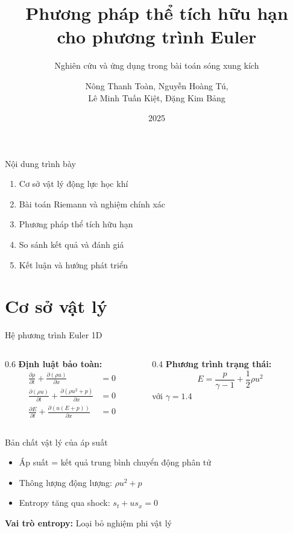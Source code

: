 \documentclass[aspectratio=169,22pt]{beamer}
\title{Phương pháp thể tích hữu hạn\\cho phương trình Euler}
\subtitle{Nghiên cứu và ứng dụng trong bài toán sóng xung kích}
\author{Nông Thanh Toàn, Nguyễn Hoàng Tú,\\Lê Minh Tuấn Kiệt, Đặng Kim Bảng}
\institute{Trường Đại học Khoa học Tự nhiên - ĐHQG TP.HCM}
\date{2025}
\begin{document}
\begin{frame}
\titlepage
\end{frame}

\begin{frame}{Nội dung trình bày}
\begin{enumerate}
\item Cơ sở vật lý động lực học khí
\item Bài toán Riemann và nghiệm chính xác
\item Phương pháp thể tích hữu hạn
\item So sánh kết quả và đánh giá
\item Kết luận và hướng phát triển
\end{enumerate}
\end{frame}

\section{Cơ sở vật lý}

\begin{frame}{Hệ phương trình Euler 1D}
\begin{columns}[T]
\begin{column}{0.6\textwidth}
\textbf{Định luật bảo toàn:}
\begin{align}
\frac{\partial \rho}{\partial t} + \frac{\partial (\rho u)}{\partial x} &= 0\\
\frac{\partial (\rho u)}{\partial t} + \frac{\partial (\rho u^2 + p)}{\partial x} &= 0\\
\frac{\partial E}{\partial t} + \frac{\partial (u(E + p))}{\partial x} &= 0
\end{align}
\end{column}
\begin{column}{0.4\textwidth}
\textbf{Phương trình trạng thái:}
$$E = \frac{p}{\gamma - 1} + \frac{1}{2}\rho u^2$$
với $\gamma = 1.4$
\end{column}
\end{columns}
\end{frame}

\begin{frame}{Bản chất vật lý của áp suất}
\begin{itemize}
\item Áp suất = kết quả trung bình chuyển động phân tử
\item Thông lượng động lượng: $\rho u^2 + p$
\item Entropy tăng qua shock: $s_t + u s_x = 0$
\end{itemize}

\vspace{1cm}
\textbf{Vai trò entropy:} Loại bỏ nghiệm phi vật lý
\end{frame}
\end{document}
